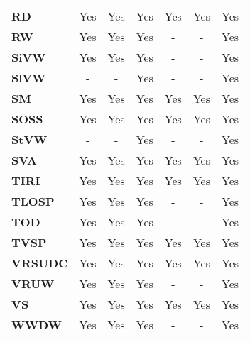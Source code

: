 \begin{table}[ht!]
\begin{tabular}{lcccccc}
\textbf{RD}          & Yes           & Yes                & Yes            & Yes                     & Yes                     & Yes            \\
\textbf{RW}          & Yes           & Yes                & Yes            & -                       & -                       & Yes            \\
\textbf{SiVW}        & Yes           & Yes                & Yes            & -                       & -                       & Yes            \\
\textbf{SlVW}        & -             & -                  & Yes            & -                       & -                       & Yes            \\
\textbf{SM}          & Yes           & Yes                & Yes            & Yes                     & Yes                     & Yes            \\
\textbf{SOSS}        & Yes           & Yes                & Yes            & Yes                     & Yes                     & Yes            \\
\textbf{StVW}        & -             & -                  & Yes            & -                       & -                       & Yes            \\
\textbf{SVA}         & Yes           & Yes                & Yes            & Yes                     & Yes                     & Yes            \\
\textbf{TIRI}        & Yes           & Yes                & Yes            & Yes                     & Yes                     & Yes            \\
\textbf{TLOSP}       & Yes           & Yes                & Yes            & -                       & -                       & Yes            \\
\textbf{TOD}         & Yes           & Yes                & Yes            & -                       & -                       & Yes            \\
\textbf{TVSP}        & Yes           & Yes                & Yes            & Yes                     & Yes                     & Yes            \\
\textbf{VRSUDC}      & Yes           & Yes                & Yes            & Yes                     & Yes                     & Yes            \\
\textbf{VRUW}        & Yes           & Yes                & Yes            & -                       & -                       & Yes            \\
\textbf{VS}          & Yes           & Yes                & Yes            & Yes                     & Yes                     & Yes            \\
\textbf{WWDW}        & Yes           & Yes                & Yes            & -                       & -                       & Yes           \\
\hline
\end{tabular}
\end{table}

